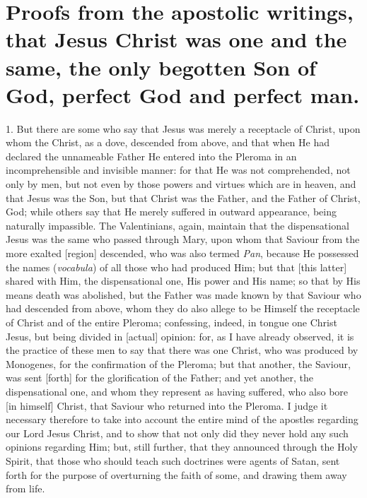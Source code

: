 \documentclass[9pt, twocolumn, oneside, a4paper]{memoir}
\begin{document}
\section*{Proofs from the apostolic writings, that Jesus Christ was one and the same, the only begotten Son of God, perfect God and perfect man.}


1. But  there are some who say that Jesus was merely a receptacle of Christ, upon whom the Christ, as a dove, descended from above, and that when He had declared the unnameable Father He entered into the Pleroma in an incomprehensible and invisible manner: for that He was not comprehended, not only by men, but not even by those powers and virtues which are in heaven, and that Jesus was the Son, but that  Christ was the Father, and the Father of Christ, God; while others say that He merely suffered in outward appearance, being naturally impassible. The Valentinians, again, maintain that the dispensational Jesus was the same who passed through Mary, upon whom that Saviour from the more exalted [region] descended, who was also termed \textit{Pan},  because He possessed the names (\textit{vocabula}) of all those who had produced Him; but that [this latter] shared with Him, the dispensational one, His power and His name; so that by His means death was abolished, but the Father was made known by that Saviour who had descended from above, whom they do also allege to be Himself the receptacle of Christ and of the entire Pleroma; confessing, indeed, in tongue one Christ Jesus, but being divided in [actual] opinion: for, as I have already observed, it is the practice of these men to say that there was one Christ, who was produced by Monogenes, for the confirmation of the Pleroma; but that another, the Saviour, was sent [forth] for the glorification of the Father; and yet another, the dispensational one, and whom they represent as having suffered, who also bore [in himself] Christ, that Saviour who returned into the Pleroma. I judge it necessary therefore to take into account the entire mind of the apostles regarding our Lord Jesus Christ, and to show that not only did they never hold any such opinions regarding Him; but, still further, that they announced through the Holy Spirit, that those who should teach such doctrines were agents of Satan, sent forth for the purpose of overturning the faith of some, and drawing them away from life.
\end{document}
